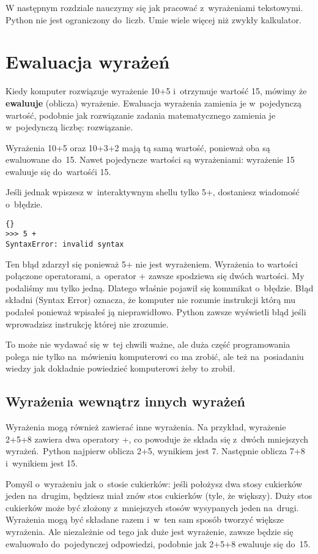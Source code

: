 \documentclass{book}
\begin{document}
W następnym rozdziale nauczymy się jak pracować z~wyrażeniami tekstowymi. Python nie jest ograniczony do~liczb. Umie wiele więcej niż zwykły kalkulator.

\section{Ewaluacja wyrażeń}

Kiedy komputer rozwiązuje wyrażenie 10+5 i~otrzymuje wartość 15, mówimy że {\bf ewaluuje} (oblicza) wyrażenie. Ewaluacja wyrażenia zamienia je w~pojedynczą wartość, podobnie jak rozwiązanie zadania matematycznego zamienia je w~pojedynczą liczbę: rozwiązanie.

Wyrażenia 10+5 oraz 10+3+2 mają tą samą wartość, ponieważ oba są ewaluowane do~15. Nawet pojedyncze wartości są wyrażeniami: wyrażenie 15 ewaluuje się do~wartośći 15.

Jeśli jednak wpiszesz w~interaktywnym shellu tylko 5+, dostaniesz wiadomość o~błędzie.
\lstset{language=python}
\begin{lstlisting}{}
>>> 5 +
SyntaxError: invalid syntax
\end{lstlisting}

Ten błąd zdarzył się ponieważ 5+ nie jest wyrażeniem. Wyrażenia to wartości połączone operatorami, a~operator + zawsze spodziewa się dwóch wartości. My podaliśmy mu tylko jedną. Dlatego właśnie pojawił się komunikat o~błędzie. Błąd składni (Syntax Error) oznacza, że komputer nie rozumie instrukcji którą mu podałeś ponieważ wpisałeś ją nieprawidłowo. Python zawsze wyświetli błąd jeśli wprowadzisz instrukcję której nie zrozumie.

To może nie wydawać się w~tej chwili ważne, ale duża część programowania polega nie tylko na~mówieniu komputerowi co ma zrobić, ale też na~posiadaniu wiedzy jak dokładnie powiedzieć komputerowi żeby to zrobił.

\subsection{Wyrażenia wewnątrz innych wyrażeń}

Wyrażenia mogą również zawierać inne wyrażenia. Na przykład, wyrażenie 2+5+8 zawiera dwa operatory +, co powoduje że składa się z~dwóch mniejszych wyrażeń.~Python najpierw oblicza 2+5, wynikiem jest 7. Następnie oblicza 7+8 i~wynikiem jest 15.

Pomyśl o~wyrażeniu jak o~stosie cukierków: jeśli położysz dwa stosy cukierków jeden na~drugim, będziesz miał znów stos cukierków (tyle, że większy). Duży stos cukierków może być złożony z~mniejszych stosów wysypanych jeden na~drugi. Wyrażenia mogą być składane razem i~w~ten sam sposób tworzyć większe wyrażenia. Ale niezależnie od tego jak duże jest wyrażenie, zawsze będzie się ewaluowało do~pojedynczej odpowiedzi, podobnie jak 2+5+8 ewaluuje się do~15.
\end{document}

